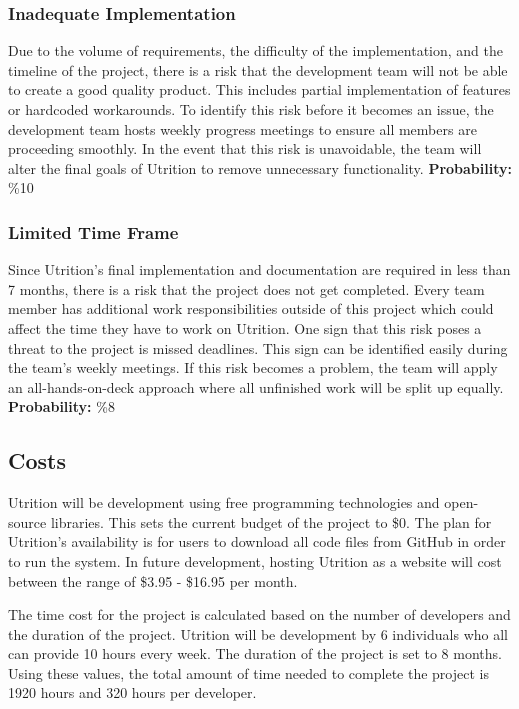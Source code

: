 \documentclass[12pt]{article}
\begin{document}
\subsubsection{Inadequate Implementation}
Due to the volume of requirements, the difficulty of the implementation, and the timeline of the project, there is a risk that the development team will not be able to create a good quality product. This includes partial implementation of features or hardcoded workarounds. To identify this risk before it becomes an issue, the development team hosts weekly progress meetings to ensure all members are proceeding smoothly. In the event that this risk is unavoidable, the team will alter the final goals of Utrition to remove unnecessary functionality.\newline
\textbf{Probability:} \%10

\subsubsection{Limited Time Frame}
Since Utrition's final implementation and documentation are required in less than 7 months, there is a risk that the project does not get completed. Every team member has additional work responsibilities outside of this project which could affect the time they have to work on Utrition. One sign that this risk poses a threat to the project is missed deadlines. This sign can be identified easily during the team's weekly meetings. If this risk becomes a problem, the team will apply an all-hands-on-deck approach where all unfinished work will be split up equally.\newline
\textbf{Probability:} \%8

\subsection{Costs}
Utrition will be development using free programming technologies and open-source libraries. This sets the current budget of the project to \$0. The plan for Utrition's availability is for users to download all code files from GitHub in order to run the system. In future development, hosting Utrition as a website will cost between the range of \$3.95 - \$16.95 per month.

The time cost for the project is calculated based on the number of developers and the duration of the project. Utrition will be development by 6 individuals who all can provide 10 hours every week. The duration of the project is set to 8 months. Using these values, the total amount of time needed to complete the project is 1920 hours and 320 hours per developer.
\end{document}
